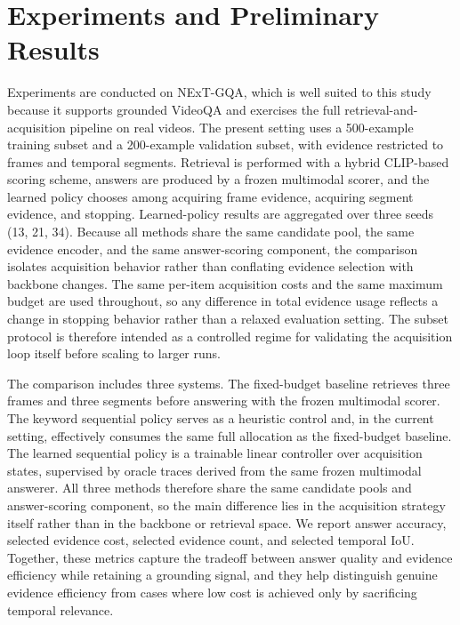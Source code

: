 \documentclass{article}
\begin{document}
\section{Experiments and Preliminary Results}
Experiments are conducted on NExT-GQA, which is well suited to this study because it supports grounded VideoQA and exercises the full retrieval-and-acquisition pipeline on real videos. The present setting uses a 500-example training subset and a 200-example validation subset, with evidence restricted to frames and temporal segments. Retrieval is performed with a hybrid CLIP-based scoring scheme, answers are produced by a frozen multimodal scorer, and the learned policy chooses among acquiring frame evidence, acquiring segment evidence, and stopping. Learned-policy results are aggregated over three seeds (13, 21, 34). Because all methods share the same candidate pool, the same evidence encoder, and the same answer-scoring component, the comparison isolates acquisition behavior rather than conflating evidence selection with backbone changes. The same per-item acquisition costs and the same maximum budget are used throughout, so any difference in total evidence usage reflects a change in stopping behavior rather than a relaxed evaluation setting. The subset protocol is therefore intended as a controlled regime for validating the acquisition loop itself before scaling to larger runs.

The comparison includes three systems. The fixed-budget baseline retrieves three frames and three segments before answering with the frozen multimodal scorer. The keyword sequential policy serves as a heuristic control and, in the current setting, effectively consumes the same full allocation as the fixed-budget baseline. The learned sequential policy is a trainable linear controller over acquisition states, supervised by oracle traces derived from the same frozen multimodal answerer. All three methods therefore share the same candidate pools and answer-scoring component, so the main difference lies in the acquisition strategy itself rather than in the backbone or retrieval space. We report answer accuracy, selected evidence cost, selected evidence count, and selected temporal IoU. Together, these metrics capture the tradeoff between answer quality and evidence efficiency while retaining a grounding signal, and they help distinguish genuine evidence efficiency from cases where low cost is achieved only by sacrificing temporal relevance.
\end{document}
